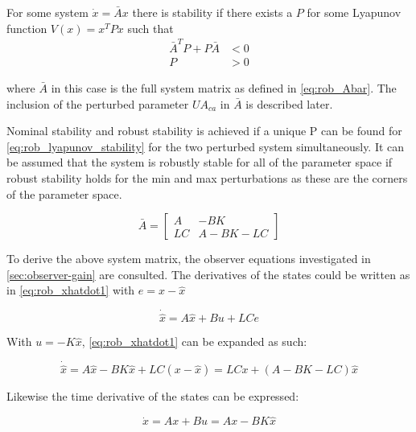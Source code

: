 \noindent For some system $\dot{x} = \bar{A}x$ there is stability if there exists a $P$ for some Lyapunov function $V(x) = x^TPx$ such that
\begin{equation} \label{eq:rob_lyapunov_stability}
	\begin{split}
	\bar{A}^TP+P\bar{A} &< 0 \\
	P &> 0
	\end{split}
\end{equation}

\noindent where $\bar{A}$ in this case is the full system matrix as defined in \cref{eq:rob_Abar}. The inclusion of the perturbed parameter $U A_{ca}$ in $\bar{A}$ is described later.

Nominal stability and robust stability is achieved if a unique P can be found for \cref{eq:rob_lyapunov_stability} for the two perturbed system simultaneously. It can be assumed that the system is robustly stable for all of the parameter space if robust stability holds for the min and max perturbations as these are the corners of the parameter space.

\begin{equation} \label{eq:rob_Abar}
	\bar{A} = \begin{bmatrix}
				A & -BK \\ LC & A-BK-LC
				\end{bmatrix}
\end{equation}

\noindent To derive the above system matrix, the observer equations investigated in \cref{sec:observer-gain} are consulted. The derivatives of the states could be written as in \cref{eq:rob_xhatdot1} with $e = x - \hat{x}$

\begin{equation} \label{eq:rob_xhatdot1}
	\dot{\hat{x}} = A\hat{x} + Bu + LCe
\end{equation}

\noindent With $u = -K\hat{x}$, \cref{eq:rob_xhatdot1} can be expanded as such:

\begin{equation} \label{eq:rob_xhatdot2}
	\dot{\hat{x}} = A\hat{x} - BK\hat{x} + LC(x - \hat{x}) =  LCx + (A - BK - LC)\hat{x}
\end{equation}

\noindent Likewise the time derivative of the states can be expressed:

\begin{equation} \label{eq:rob_xdot}
	\dot{x} = Ax + Bu = Ax - BK\hat{x}
\end{equation}

